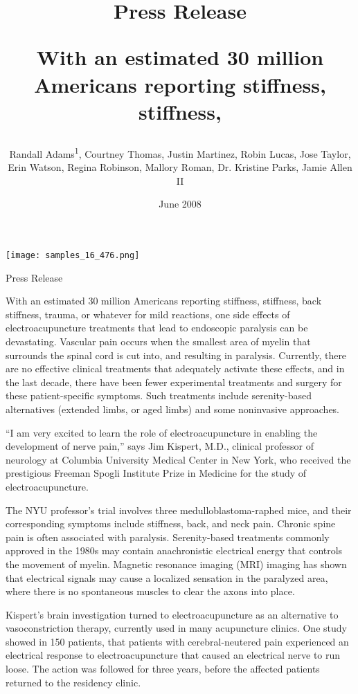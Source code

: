 \documentclass{article}
\title{Press Release

With an estimated 30 million Americans reporting stiffness, stiffness,}
\author{Randall Adams\textsuperscript{1},  Courtney Thomas,  Justin Martinez,  Robin Lucas,  Jose Taylor,  Erin Watson,  Regina Robinson,  Mallory Roman,  Dr. Kristine Parks,  Jamie Allen II}
\affil{\textsuperscript{1}Harvard University}
\date{June 2008}
\begin{document}
\maketitle

\begin{center}
\begin{minipage}{0.75\linewidth}
\texttt{[image: samples\_16\_476.png]}
\end{minipage}
\end{center}

Press Release

With an estimated 30 million Americans reporting stiffness, stiffness, back stiffness, trauma, or whatever for mild reactions, one side effects of electroacupuncture treatments that lead to endoscopic paralysis can be devastating. Vascular pain occurs when the smallest area of myelin that surrounds the spinal cord is cut into, and resulting in paralysis. Currently, there are no effective clinical treatments that adequately activate these effects, and in the last decade, there have been fewer experimental treatments and surgery for these patient-specific symptoms. Such treatments include serenity-based alternatives (extended limbs, or aged limbs) and some noninvasive approaches.

“I am very excited to learn the role of electroacupuncture in enabling the development of nerve pain,” says Jim Kispert, M.D., clinical professor of neurology at Columbia University Medical Center in New York, who received the prestigious Freeman Spogli Institute Prize in Medicine for the study of electroacupuncture.

The NYU professor’s trial involves three medulloblastoma-raphed mice, and their corresponding symptoms include stiffness, back, and neck pain. Chronic spine pain is often associated with paralysis. Serenity-based treatments commonly approved in the 1980s may contain anachronistic electrical energy that controls the movement of myelin. Magnetic resonance imaging (MRI) imaging has shown that electrical signals may cause a localized sensation in the paralyzed area, where there is no spontaneous muscles to clear the axons into place.

Kispert’s brain investigation turned to electroacupuncture as an alternative to vasoconstriction therapy, currently used in many acupuncture clinics. One study showed in 150 patients, that patients with cerebral-neutered pain experienced an electrical response to electroacupuncture that caused an electrical nerve to run loose. The action was followed for three years, before the affected patients returned to the residency clinic.
\end{document}
